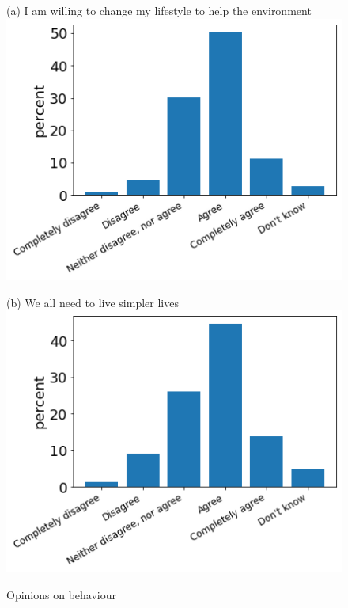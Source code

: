 \documentclass[12pt]{article}
\begin{document}
\begin{figure}[h!!]
	\centering	
	\caption{Opinions on behaviour}\label{fig:opinions}	
	\begin{minipage}[h!!]{0.32\textwidth}  
		\centering\footnotesize{(a) I am willing to change my lifestyle to help the environment}
		\includegraphics[width=1\textwidth]{../codding_data/results/liss/qk20a175title0.png}
	\end{minipage}
	\begin{minipage}[h!!]{0.32\textwidth}
		\centering\footnotesize{(b) We all need to live simpler lives}
		\includegraphics[width=1\textwidth]{../codding_data/results/liss/qk20a181title0.png}

\end{minipage}
\end{figure}
\end{document}
